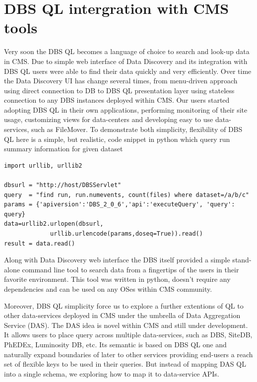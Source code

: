 \documentclass[a4paper]{jpconf}
\begin{document}
\section{DBS QL intergration with CMS tools}
Very soon the DBS QL becomes a language of choice to search
and look-up data in CMS. Due to simple web interface of
Data Discovery\cite{DD}  and its integration with DBS QL
users were able to find their data quickly and very
efficiently. Over time the Data Discovery UI has
change several times, from menu-driven approach using
direct connection to DB to DBS QL presentation layer
using stateless connection to any DBS instances deployed
within CMS. Our users started adopting DBS QL in their
own applications, performing monitoring of their
site usage, customizing views for data-centers
and developing easy to use data-services, such as
FileMover\cite{FileMover}. To demonstrate both simplicity,
flexibility of DBS QL here is a simple, but realistic,
code snippet in python which query run summary information
for given dataset
\begin{verbatim}
import urllib, urllib2

dbsurl = "http://host/DBSServlet"
query  = "find run, run.numevents, count(files) where dataset=/a/b/c"
params = {'apiversion':'DBS_2_0_6','api':'executeQuery', 'query': query} 
data=urllib2.urlopen(dbsurl,
             urllib.urlencode(params,doseq=True)).read()
result = data.read()
\end{verbatim}
Along with Data Discovery web interface the DBS itself 
provided a simple stand-alone command line tool
to search data from a fingertips of the users in their
favorite environment. This tool was written
in python, doesn't require any dependencies and can
be used on any OSes within CMS community.

Moreover, DBS QL simplicity force us to explore a further
extentions of QL to other data-services deployed in CMS under
the umbrella of Data Aggregation Service (DAS). The DAS idea is
novel within CMS and still under development.
It allows users to place query across multiple data-services,
such as DBS, SiteDB, PhEDEx, Luminosity DB, etc. Its semantic
is based on DBS QL one and naturally
expand boundaries of later to other services providing
end-users a reach set of flexible keys to be used in their
queries. But instead of mapping DAS QL into a single
schema, we exploring how to map it to data-service APIs. 
\end{document}
